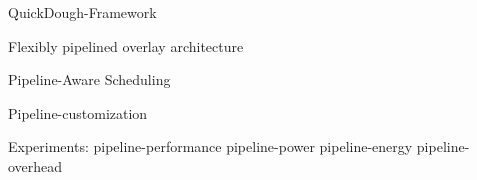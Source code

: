 QuickDough-Framework

Flexibly pipelined overlay architecture

Pipeline-Aware Scheduling

Pipeline-customization

Experiments:
  pipeline-performance
  pipeline-power
  pipeline-energy
  pipeline-overhead 
